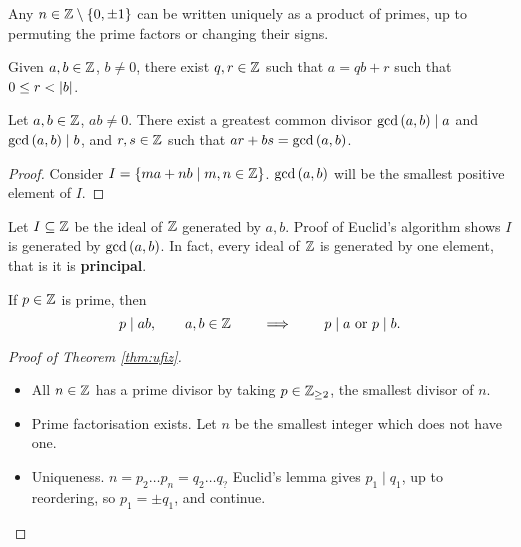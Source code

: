 \begin{theorem}
\label{thm:ufiz}
Any $ n \in \mathbb{Z} \setminus \left\{ 0, \pm 1 \right\} $ can be written uniquely as a product of primes, up to permuting the prime factors or changing their signs.
\end{theorem}

\begin{proposition}
Given $ a, b \in \mathbb{Z} $, $ b \ne 0 $, there exist $ q, r \in \mathbb{Z} $ such that $ a = qb + r $ such that $ 0 \le r < \left\lvert b \right\rvert $.
\end{proposition}

\begin{proposition}
Let $ a, b \in \mathbb{Z} $, $ ab \ne 0 $. There exist a greatest common divisor $ \gcd\left( a, b \right) \mid a $ and $ \gcd\left( a, b \right) \mid b $, and $ r, s \in \mathbb{Z} $ such that $ ar + bs = \gcd\left( a, b \right) $.
\end{proposition}

\begin{proof}
Consider $ I = \left\{ ma + nb \mid m, n \in \mathbb{Z} \right\} $. $ \gcd\left( a, b \right) $ will be the smallest positive element of $ I $.
\end{proof}

Let $ I \subseteq \mathbb{Z} $ be the ideal of $ \mathbb{Z} $ generated by $ a, b $. Proof of Euclid's algorithm shows $ I $ is generated by $ \gcd\left( a, b \right) $. In fact, every ideal of $ \mathbb{Z} $ is generated by one element, that is it is \textbf{principal}.

\begin{proposition}
If $ p \in \mathbb{Z} $ is prime, then
$$ p \mid ab, \qquad a, b \in \mathbb{Z} \qquad \implies \qquad p \mid a \ \text{or} \ p \mid b. $$
\end{proposition}

\begin{proof}[Proof of Theorem \ref{thm:ufiz}]
\hfill
\begin{itemize}
\item All $ n \in \mathbb{Z} $ has a prime divisor by taking $ p \in \mathbb{Z}_{\ge 2} $, the smallest divisor of $ n $.
\item Prime factorisation exists. Let $ n $ be the smallest integer which does not have one.
\item Uniqueness. $ n = p_2 \dots p_n = q_2 \dots q_? $ Euclid's lemma gives $ p_1 \mid q_1 $, up to reordering, so $ p_1 = \pm q_1 $, and continue.
\end{itemize}
\end{proof}

